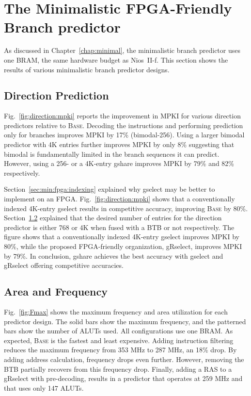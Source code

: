 \section{The Minimalistic FPGA-Friendly Branch predictor}
\label{sec:eval:min}
As discussed in Chapter~\ref{chap:minimal}, the minimalistic branch predictor uses one BRAM, the same hardware budget as Nios~II-f. This section shows the results of various minimalistic branch predictor designs.

\subsection{Direction Prediction}
\label{sec:eval:min:direction}
Fig.~\ref{fig:direction:mpki} reports the improvement in MPKI for various direction predictors relative to \textsc{Base}. Decoding the instructions and performing prediction only for branches improves MPKI by 17\% (bimodal-256). Using a larger bimodal predictor with 4K entries further improves MPKI by only 8\% suggesting that bimodal is fundamentally limited in the branch sequences it can predict. However, using a 256- or a 4K-entry gshare improves MPKI by 79\% and 82\% respectively. 


Section~\ref{sec:min:fpga:indexing} explained why gselect may be better to implement on an FPGA. Fig.~\ref{fig:direction:mpki} shows that a conventionally indexed 4K-entry gselect results in competitive accuracy, improving \textsc{Base} by 80\%. Section~\ref{sec:eval:min:fmax} explained that the desired number of entries for the direction predictor is either 768 or 4K when fused with a BTB or not respectively. The figure shows that a conventionally indexed 4K-entry gselect improves MPKI by 80\%, while the proposed FPGA-friendly organization, gRselect, improves MPKI by 79\%. In conclusion, gshare achieves the best accuracy with gselect and gRselect offering competitive accuracies.

\subsection{Area and Frequency}
\label{sec:eval:min:fmax}
Fig.~\ref{fig:Fmax} shows the maximum frequency and area utilization for each predictor design. The solid bars show the maximum frequency, and the patterned bars show the number of ALUTs used. All configurations use one BRAM. As expected, \textsc{Base} is the fastest and least expensive. Adding instruction filtering reduces the maximum frequency from 353 MHz to 287 MHz, an 18\% drop. By adding address calculation, frequency drops even further. However, removing the BTB partially recovers from this frequency drop. Finally, adding a RAS to a gRselect with pre-decoding, results in a predictor that operates at 259 MHz and that uses only 147 ALUTs.

